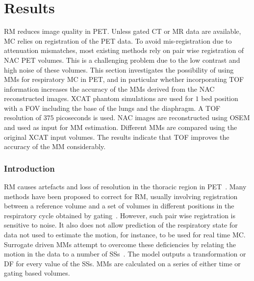 \chapter{Results} \label{results}
    \blindtext
    
        \gls{RM} reduces image quality in \gls{PET}. Unless gated \gls{CT} or \gls{MR} data are available, \gls{MC} relies on registration of the \gls{PET} data. To avoid mis-registration due to attenuation mismatches, most existing methods rely on pair wise registration of \gls{NAC} \gls{PET} volumes. This is a challenging problem due to the low contrast and high noise of these volumes. This section investigates the possibility of using \gls{MM}s for respiratory \gls{MC} in \gls{PET}, and in particular whether incorporating \gls{TOF} information increases the accuracy of the \gls{MM}s derived from the \gls{NAC} reconstructed images. \gls{XCAT} phantom simulations are used for $1$ bed position with a \gls{FOV} including the base of the lungs and the diaphragm. A \gls{TOF} resolution of $375$ picoseconds is used. \gls{NAC} images are reconstructed using \gls{OSEM} and used as input for \gls{MM} estimation. Different \gls{MM}s are compared using the original \gls{XCAT} input volumes. The results indicate that \gls{TOF} improves the accuracy of the \gls{MM} considerably.
        
        \subsection{Introduction} \label{impact_of_tof_on_respiratory_motion_modelling_using_nac_pet_introduction}
        \gls{RM} causes artefacts and loss of resolution in the thoracic region in \gls{PET}~. Many methods have been proposed to correct for \gls{RM}, usually involving registration between a reference volume and a set of volumes in different positions in the respiratory cycle obtained by gating~. However, such pair wise registration is sensitive to noise. It also does not allow prediction of the respiratory state for data not used to estimate the motion, for instance, to be used for real time \gls{MC}. Surrogate driven \gls{MM}s attempt to overcome these deficiencies by relating the motion in the data to a number of \gls{SS}s~. The model outputs a transformation or \gls{DF} for every value of the \gls{SS}s. \gls{MM}s are calculated on a series of either time or gating based volumes.

